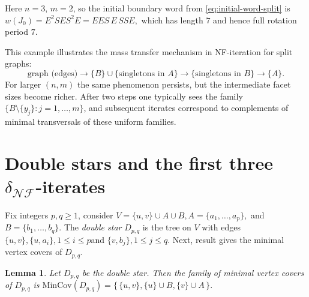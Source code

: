 \documentclass[12pt]{article}
\theoremstyle{plain}
\newtheorem{lemma}[theorem]{Lemma}
\theoremstyle{definition}
\newcommand{\MIN}{\mathrm{MinCov}}
\newcommand{\V}{V}
\begin{document}
	 Here $n=3$, $m=2$, so the initial boundary word from \eqref{eq:initial-word-split} is
	 $w(J_0)=E^{2}SE S^{2}E = EES\,E\,SSE,$ which has length $7$ and hence full rotation period $7$.
	
	
	
	
	
	
	
	
	 
		This example illustrates the mass transfer mechanism in NF-iteration for split graphs:
		\[
		\text{graph (edges)} \longrightarrow \{B\}\cup\{\text{singletons in }A\} \longrightarrow \{\text{singletons in }B\} \longrightarrow \{A\}.
		\]
		For larger $(n,m)$ the same phenomenon persists, but the intermediate facet sizes become richer. After two steps one typically sees
		the family $\{B\setminus\{y_j\}:j=1,\dots,m\}$, and subsequent iterates correspond to complements of minimal transversals of these uniform families. 
	
	
	
	

		
		
		
		
		\section{Double stars and the first three \(\delta_{\mathcal{NF}}\)-iterates}\label{section 5}
		Fix integers \(p,q\ge 1\), consider  $\V = \{u,v\} \cup A \cup B, A=\{a_1,\dots,a_p\},$ and $ B=\{b_1,\dots,b_q\}.$ The \emph{double star} \(D_{p,q}\) is the tree on \(\V\) with edges $\{u,v\}, \{u,a_i\}, 1\le i\le p $and $ \{v,b_j\}, 1\le j\le q.$
		 Next, result gives the minimal vertex covers of \(D_{p,q}\).
		\begin{lemma}\label{lem:mincov-double-star}
			Let \(D_{p,q}\) be the double star. Then the family of minimal vertex covers of \(D_{p,q}\) is
			$\MIN(D_{p,q})=\bigl\{\,\{u,v\}, \{u\}\cup B, \{v\}\cup A\,\bigr\}.$ 
		\end{lemma}
		
\end{document}
